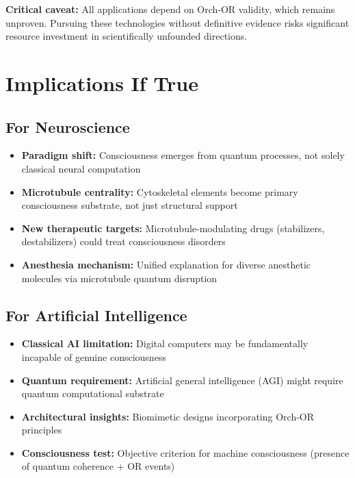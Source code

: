\begin{warningbox}
\textbf{Critical caveat:} All applications depend on Orch-OR validity, which remains unproven. Pursuing these technologies without definitive evidence risks significant resource investment in scientifically unfounded directions.
\end{warningbox}

\section{Implications If True}

\subsection{For Neuroscience}

\begin{itemize}
\item \textbf{Paradigm shift:} Consciousness emerges from quantum processes, not solely classical neural computation
\item \textbf{Microtubule centrality:} Cytoskeletal elements become primary consciousness substrate, not just structural support
\item \textbf{New therapeutic targets:} Microtubule-modulating drugs (stabilizers, destabilizers) could treat consciousness disorders
\item \textbf{Anesthesia mechanism:} Unified explanation for diverse anesthetic molecules via microtubule quantum disruption
\end{itemize}

\subsection{For Artificial Intelligence}

\begin{itemize}
\item \textbf{Classical AI limitation:} Digital computers may be fundamentally incapable of genuine consciousness
\item \textbf{Quantum requirement:} Artificial general intelligence (AGI) might require quantum computational substrate
\item \textbf{Architectural insights:} Biomimetic designs incorporating Orch-OR principles
\item \textbf{Consciousness test:} Objective criterion for machine consciousness (presence of quantum coherence + OR events)
\end{itemize}


